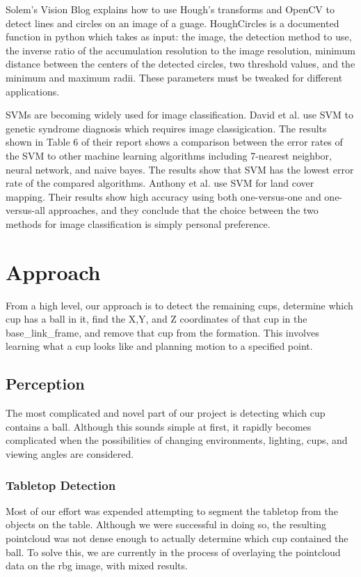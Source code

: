 \documentclass[letterpaper, 10 pt, conference]{ieeeconf}  %
\begin{document}
Solem’s Vision Blog explains how to use Hough’s transforms and OpenCV to detect lines and circles on an image of a guage. HoughCircles is a documented function in python which takes as input: the image, the detection method to use, the inverse ratio of the accumulation resolution to the image resolution, minimum distance between the centers of the detected circles, two threshold values, and the minimum and maximum radii. These parameters must be tweaked for different applications.

SVMs are becoming widely used for image classification. David et al. use SVM to genetic syndrome diagnosis which requires image classigication. The results shown in Table 6 of their report shows a comparison between the error rates of the SVM to other machine learning algorithms including 7-nearest neighbor, neural network, and naive bayes. The results show that SVM has the lowest error rate of the compared algorithms. Anthony et al. use SVM for land cover mapping. Their results show high accuracy using both one-versus-one and one-versus-all approaches, and they conclude that the choice between the two methods for image classification is simply personal preference.

\section{Approach}

From a high level, our approach is to detect the remaining cups, determine which cup has a ball in it, find the X,Y, and Z coordinates of that cup in the base\_link\_frame, and remove that cup from the formation.  This involves learning what a cup looks like and planning motion to a specified point.

\subsection{Perception}

The most complicated and novel part of our project is detecting which cup contains a ball.  Although this sounds simple at first, it rapidly becomes complicated when the possibilities of changing environments, lighting, cups, and viewing angles are considered.

\subsubsection{Tabletop Detection}

Most of our effort was expended attempting to segment the tabletop from the objects on the table.  Although we were successful in doing so, the resulting pointcloud was not dense enough to actually determine which cup contained the ball.  To solve this, we are currently in the process of overlaying the pointcloud data on the rbg image, with mixed results.
\end{document}

